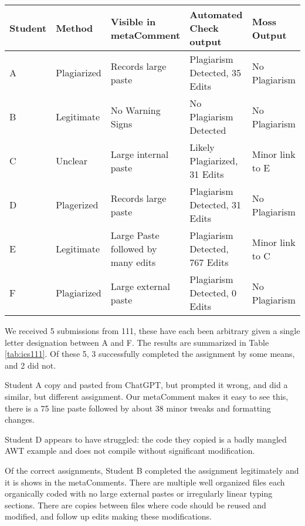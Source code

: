 \documentclass[letterpaper,10pt,conference]{IEEEtran}
\newcommand{\metaComment}{metaComment\xspace}
\begin{document}
\begin{table*}[thb]
    \centering
    \caption{ICS 111 Case study}
    \label{tab:ics111}
    \begin{tabular}{|l|l|l|l|l|}
        \hline
        Student & Method & Visible in \metaComment & Automated Check output & Moss Output \\
        \hline
        A & Plagiarized & Records large paste & Plagiarism Detected, 35 Edits & No Plagiarism \\\rowcolor{Gray}
        B & Legitimate & No Warning Signs & No Plagiarism Detected & No Plagiarism \\
        C & Unclear & Large internal paste & Likely Plagiarized, 31 Edits & Minor link to E \\\rowcolor{Gray}
        D & Plagerized& Records large paste & Plagiarism Detected, 31 Edits & No Plagiarism \\
        E & Legitimate & Large Paste followed by many edits & Plagiarism Detected, 767 Edits & Minor link to C \\\rowcolor{Gray}
        F & Plagiarized & Large external paste & Plagiarism Detected, 0 Edits & No Plagiarism \\
        \hline
    \end{tabular}
\end{table*}


We received 5 submissions from 111, these have each been arbitrary given a single letter designation between A and F.  The results are summarized in Table \ref{tab:ics111}.  Of these 5, 3 successfully completed the assignment by some means, and 2 did not.

  Student A copy and pasted from ChatGPT, but prompted it wrong, and did a similar, but different assignment.  Our \metaComment makes it easy to see this, there is a 75 line paste followed by about 38 minor tweaks and formatting changes.

Student D appears to have struggled: the code they copied is a badly mangled AWT example and does not compile without significant modification.

Of the correct assignments, Student B completed the assignment legitimately and it is shows in the \metaComment{}s.  There are multiple well organized files each organically coded with no large external pastes or irregularly linear typing sections.  There are copies between files where code should be reused and modified, and follow up edits making these modifications.
\end{document}
